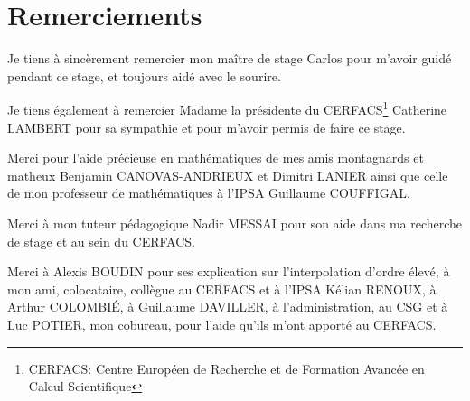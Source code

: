 \chapter*{Remerciements}

Je tiens à sincèrement remercier mon maître de stage Carlos pour m'avoir guidé pendant
ce stage, et toujours aidé avec le sourire.

Je tiens également à remercier Madame la présidente du
CERFACS\footnote{CERFACS: Centre Européen de Recherche et de Formation Avancée en Calcul Scientifique} Catherine LAMBERT pour sa sympathie et pour m'avoir permis de faire ce stage.

Merci pour l'aide précieuse en mathématiques de mes amis montagnards et matheux Benjamin
CANOVAS-ANDRIEUX et Dimitri LANIER ainsi que celle de mon professeur de mathématiques à l'IPSA Guillaume COUFFIGAL.

Merci à mon tuteur pédagogique Nadir MESSAI pour son aide dans ma recherche de stage et au sein du CERFACS.

Merci à Alexis BOUDIN pour ses explication sur l'interpolation d'ordre élevé, à mon ami, colocataire, collègue au CERFACS et à l'IPSA Kélian RENOUX, à Arthur COLOMBIÉ, à Guillaume DAVILLER, à l'administration, au CSG et à Luc POTIER, mon cobureau, pour l'aide qu'ils m'ont apporté au CERFACS.